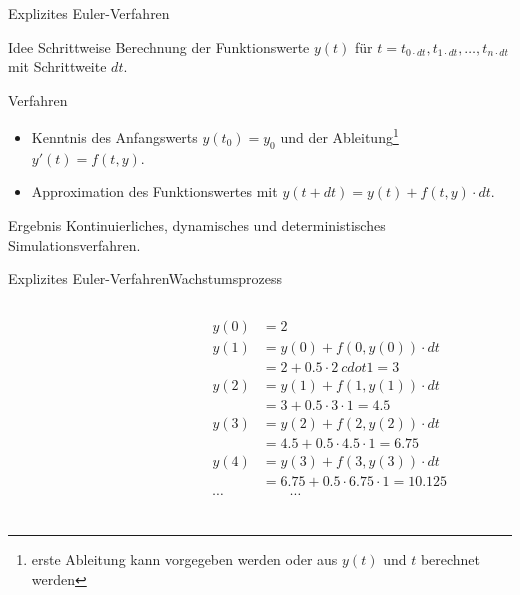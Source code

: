 \documentclass[xelatex,aspectratio=169]{beamer}
\begin{document}
\begin{frame}{Explizites Euler-Verfahren}
    \begin{block}{Idee}
        Schrittweise Berechnung der Funktionswerte $y(t)$ für $t = t_{0 \cdot dt}, t_{1 \cdot dt}, \ldots, t_{n \cdot dt}$ mit Schrittweite $dt$.
    \end{block}

    \begin{block}{Verfahren}
        \begin{itemize}
            \item Kenntnis des Anfangswerts $y(t_0) = y_0$ und der Ableitung\footnote{erste Ableitung kann vorgegeben werden oder aus $y(t)$ und $t$ berechnet werden} $y'(t) = f(t, y)$.
            \item Approximation des Funktionswertes mit $y(t + dt) = y(t) + f(t, y) \cdot dt$.
        \end{itemize}
    \end{block}

    \begin{block}{Ergebnis}
        Kontinuierliches, dynamisches und deterministisches Simulationsverfahren.

    \end{block}
\end{frame}


\begin{frame}{Explizites Euler-Verfahren}{Wachstumsprozess}
    \begin{columns}[onlytextwidth]
        \begin{column}{0.5\textwidth}
            \inputminted[firstline=7, lastline=17]{python}{src/sim_growth.py}
        \end{column}
        \begin{column}{0.5\textwidth}
            \[
                \begin{aligned}
                    y(0)   & = 2                                      \\
                    y(1)   & = y(0) + f(0, y(0)) \cdot dt             \\
                           & = 2 + 0.5 \cdot 2 \ cdot 1 = 3           \\
                    y(2)   & = y(1) + f(1, y(1)) \cdot dt             \\
                           & = 3 + 0.5 \cdot 3 \cdot 1 = 4.5          \\
                    y(3)   & = y(2) + f(2, y(2)) \cdot dt             \\
                           & = 4.5 + 0.5 \cdot 4.5 \cdot 1 = 6.75     \\
                    y(4)   & = y(3) + f(3, y(3)) \cdot dt             \\
                           & = 6.75 + 0.5 \cdot 6.75 \cdot 1 = 10.125 \\
                    \cdots & \qquad\cdots                             \\
                \end{aligned}
            \]
        \end{column}
    \end{columns}
\end{frame}
\end{document}
